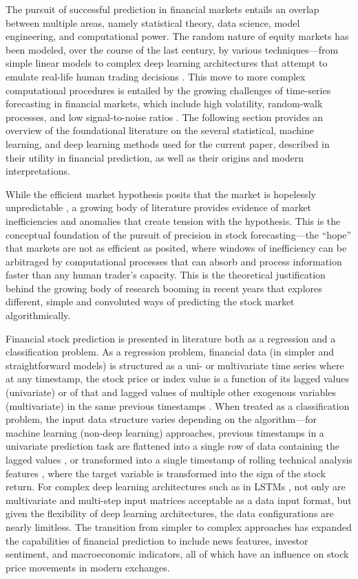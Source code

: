 \documentclass[stu,floatsintext]{apa7}
\begin{document}
The pursuit of successful prediction in financial markets entails an overlap between multiple areas, namely statistical theory, data science, model engineering, and computational power. The random nature of equity markets has been modeled, over the course of the last century, by various techniques—from simple linear models to complex deep learning architectures that attempt to emulate real-life human trading decisions \parencite{sable2023techniques}. This move to more complex computational procedures is entailed by the growing challenges of time-series forecasting in financial markets, which include high volatility, random-walk processes, and low signal-to-noise ratios \parencite{somkunwar2024arima}. The following section provides an overview of the foundational literature on the several statistical, machine learning, and deep learning methods used for the current paper, described in their utility in financial prediction, as well as their origins and modern interpretations.

While the efficient market hypothesis posits that the market is hopelessly unpredictable \parencite{beniwal2025adaptive}, a growing body of literature provides evidence of market inefficiencies and anomalies that create tension with the hypothesis. This is the conceptual foundation of the pursuit of precision in stock forecasting—the “hope” that markets are not as efficient as posited, where windows of inefficiency can be arbitraged by computational processes that can absorb and process information faster than any human trader’s capacity. This is the theoretical justification behind the growing body of research booming in recent years that explores different, simple and convoluted ways of predicting the stock market algorithmically.

Financial stock prediction is presented in literature both as a regression and a classification problem. As a regression problem, financial data (in simpler and straightforward models) is structured as a uni- or multivariate time series where at any timestamp, the stock price or index value is a function of its lagged values (univariate) or of that and lagged values of multiple other exogenous variables (multivariate) in the same previous timestamps \parencite{funde2023comparison}. When treated as a classification problem, the input data structure varies depending on the algorithm—for machine learning (non-deep learning) approaches, previous timestamps in a univariate prediction task are flattened into a single row of data containing the lagged values \parencite{krauss2016deep}, or transformed into a single timestamp of rolling technical analysis features \parencite{patel2014predicting}, where the target variable is transformed into the sign of the stock return. For complex deep learning architectures such as in LSTMs \parencite{chen2021stock}, not only are multivariate and multi-step input matrices acceptable as a data input format, but given the flexibility of deep learning architectures, the data configurations are nearly limitless. The transition from simpler to complex approaches has expanded the capabilities of financial prediction to include news features, investor sentiment, and macroeconomic indicators, all of which have an influence on stock price movements in modern exchanges.
\end{document}

